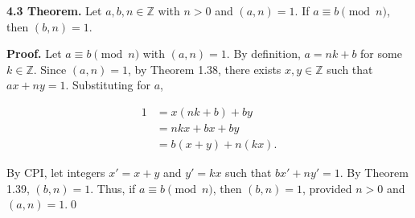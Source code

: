 \documentclass[12pt]{article}
\begin{document}
\noindent\textbf{4.3 Theorem.} Let $a,b,n\in\mathbb{Z}$ with $n>0$ and $(a,n)=1$. If $a\equiv b\pmod n$, then $(b,n)=1$.

\bigskip

\noindent\textbf{Proof.} Let $a\equiv b\pmod n$ with $(a,n)=1$. By definition, $a=nk+b$ for some $k\in\mathbb{Z}$. Since $(a,n)=1$, by Theorem 1.38, there exists $x,y\in\mathbb{Z}$ such that $ax+ny=1$. Substituting for $a$,

\begin{align*}
1 &= x(nk+b)+by\\
&= nkx + bx + by\\
&= b(x+y)+n(kx).
\end{align*}

\noindent By CPI, let integers $x'=x+y$ and $y'=kx$ such that $bx'+ny'=1$. By Theorem 1.39, $(b,n)=1$. Thus, if $a\equiv b\pmod n$, then $(b,n)=1$, provided $n>0$ and $(a,n)=1$.\qed
\end{document}
